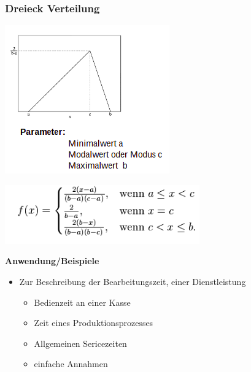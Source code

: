 \subsubsection{Dreieck Verteilung}
\begin{minipage}[t]{0.425\textwidth}
\centering
\includegraphics[width=0.9\linewidth]{images/dreieck-verteilung.png}
\end{minipage}
\begin{minipage}[t]{0.45\textwidth}
\centering
\includegraphics[width=0.9\linewidth]{images/dreieck-definition.png}
\end{minipage}

\textbf{Anwendung/Beispiele}
\begin{itemize}
        \item Zur Beschreibung der Bearbeitungszeit, einer Dienstleistung 
        \begin{itemize}
            \item Bedienzeit an einer Kasse
            \item Zeit eines Produktionsprozesses
            \item Allgemeinen Sericezeiten
            \item einfache Annahmen
        \end{itemize}
\end{itemize}

